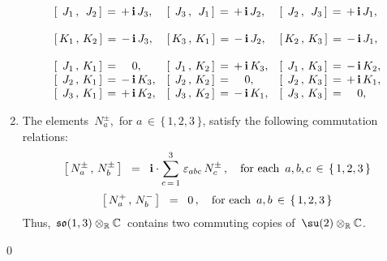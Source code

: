 \begin{corollary}
\begin{enumerate}
\begin{equation*}
\begin{array}{lll}
	\left[\,\;J_{1}\,,\,\;J_{2}\,\right] \,=\, + \, \i \, J_{3}, &
	\left[\,\;J_{3}\,,\,\;J_{1}\,\right] \,=\, + \, \i \, J_{2}, &
	\left[\,\;J_{2}\,,\,\;J_{3}\,\right] \,=\, + \, \i \, J_{1},
	\\ \\
	\left[\,K_{1}\,,\,K_{2}\,\right] \,=\, - \, \i \, J_{3}, &
	\left[\,K_{3}\,,\,K_{1}\,\right] \,=\, - \, \i \, J_{2}, &
	\left[\,K_{2}\,,\,K_{3}\,\right] \,=\, - \, \i \, J_{1},
	\\ \\
	\left[\,\;J_{1}\,,\,K_{1}\,\right] \,=\, {\color{white}-}\,0,\;\;\;\; &
	\left[\,\;J_{1}\,,\,K_{2}\,\right] \,=\, + \, \i \, K_{3}, &
	\left[\,\;J_{1}\,,\,K_{3}\,\right] \,=\, - \, \i \, K_{2},
	\\
	\left[\,\;J_{2}\,,\,K_{1}\,\right] \,=\, - \, \i \, K_{3}, &
	\left[\,\;J_{2}\,,\,K_{2}\,\right] \,=\, {\color{white}-}\,0,\;\;\;\; &
	\left[\,\;J_{2}\,,\,K_{3}\,\right] \,=\, + \, \i \, K_{1},
	\\
	\left[\,\;J_{3}\,,\,K_{1}\,\right] \,=\, + \, \i \, K_{2}, &
	\left[\,\;J_{3}\,,\,K_{2}\,\right] \,=\, - \, \i \, K_{1}, &
	\left[\,\;J_{3}\,,\,K_{3}\,\right] \,=\, {\color{white}-}\,0,\;\;\;\;
	\end{array}
	\end{equation*}
\item
	The elements
	\,$N^{\pm}_{a}$,\, for $a \,\in\, \{\,1,2,3\,\}$,
	satisfy the following commutation relations:
	\begin{equation*}
	\left[\,N^{\pm}_{a}\,,\,N^{\pm}_{b}\,\right]
	\;\;=\;\;
		\textnormal{\bf i} \cdot \overset{3}{\underset{c\,=\,1}{\sum}} \;\varepsilon_{abc} \, N^{\pm}_{c}\,,
	\quad
	\textnormal{for each \,$a, b, c \,\in\, \{\,1, 2, 3\,\}$}
	\end{equation*}
	\begin{equation*}
	\left[\,N^{+}_{a}\,,\,N^{-}_{b}\,\right] \;\;=\;\; 0\,,
	\quad
	\textnormal{for each \,$a, b \,\in\, \{\,1, 2, 3\,\}$}
	\end{equation*}
	Thus,
	\,$\mathfrak{so}(1,3) \otimes_{\mathbb{R}} \mathbb{C}$\,
	contains two commuting copies of
	\,$\su(2) \otimes_{\Re} \C$.\,
\end{enumerate}
\end{corollary}
\proof

\qed


